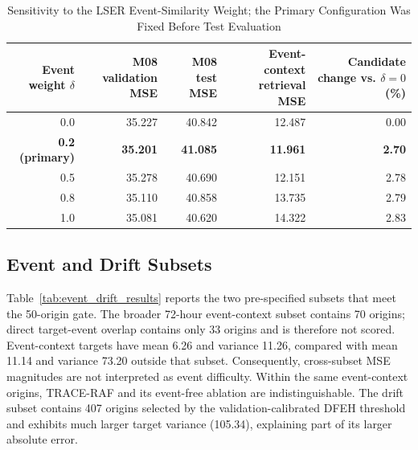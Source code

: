 \documentclass{ieeeaccess}
\begin{document}
\begin{table}[!t]
\centering
\caption{Sensitivity to the LSER Event-Similarity Weight; the Primary
Configuration Was Fixed Before Test Evaluation}
\label{tab:event_weight_sensitivity}
\begin{tabular}{rrrrr}
\toprule
Event weight $\delta$ & M08 validation MSE & M08 test MSE & Event-context retrieval MSE & Candidate change vs. $\delta=0$ (\%) \\
\midrule
0.0 & 35.227 & 40.842 & 12.487 & 0.00 \\
\textbf{0.2 (primary)} & \textbf{35.201} & \textbf{41.085} & \textbf{11.961} & \textbf{2.70} \\
0.5 & 35.278 & 40.690 & 12.151 & 2.78 \\
0.8 & 35.110 & 40.858 & 13.735 & 2.79 \\
1.0 & 35.081 & 40.620 & 14.322 & 2.83 \\
\bottomrule
\end{tabular}
\end{table}

\subsection{Event and Drift Subsets}
Table~\ref{tab:event_drift_results} reports the two pre-specified subsets that
meet the 50-origin gate. The broader 72-hour event-context subset contains 70
origins; direct target-event overlap contains only 33 origins and is therefore
not scored. Event-context targets have mean 6.26 and variance 11.26, compared
with mean 11.14 and variance 73.20 outside that subset. Consequently,
cross-subset MSE magnitudes are not interpreted as event difficulty. Within the
same event-context origins, TRACE-RAF and its event-free ablation are
indistinguishable. The drift subset contains 407 origins selected by the
validation-calibrated DFEH threshold and exhibits much larger target variance
(105.34), explaining part of its larger absolute error.
\end{document}
